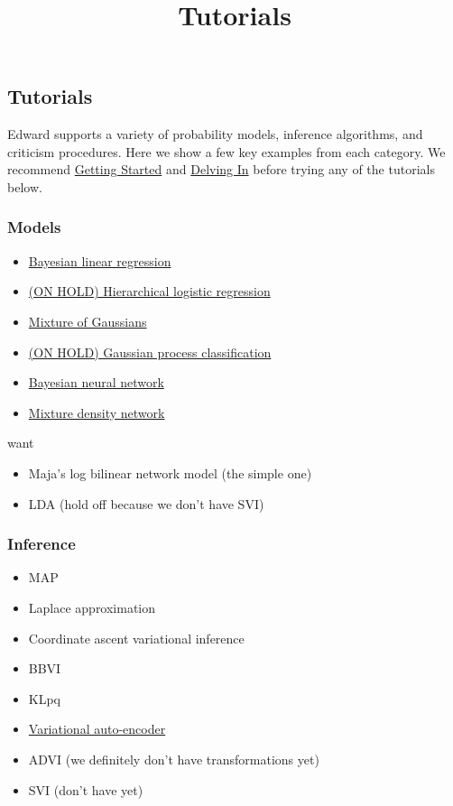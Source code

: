 \title{Tutorials}

\subsection{Tutorials}

Edward supports a variety of probability models, inference
algorithms, and criticism procedures. Here we show a few key examples from each
category. We recommend \href{getting-started.html}{Getting Started} and 
\href{delving-in.html}{Delving In} before trying any of the tutorials below.

\subsubsection{Models}

\begin{itemize}
\item \href{tut_bayesian_linear_regression.html}{Bayesian linear regression}
\item
  \href{tut_hierarchical_logistic_regression.html}{(ON HOLD) Hierarchical
  logistic regression}
\item
  \href{tut_mixture_gaussian.html}{Mixture of Gaussians}
\item
  \href{tut_gp_classification.html}{(ON HOLD) Gaussian process classification}
\item
  \href{https://github.com/blei-lab/edward/blob/master/examples/bayesian_nn.py}{Bayesian
  neural network}
\item
  \href{https://github.com/blei-lab/edward/blob/master/examples/mixture_density_network.py}{Mixture
  density network}
\end{itemize}

want

\begin{itemize}
  \item Maja's log bilinear network model (the simple one)
  \item LDA (hold off because we don't have SVI)
\end{itemize}

\subsubsection{Inference}

\begin{itemize}
  \item MAP
  \item Laplace approximation
  \item Coordinate ascent variational inference
  \item BBVI
  \item KLpq
  \item
  \href{https://github.com/blei-lab/edward/blob/master/examples/convolutional_vae.py}{Variational
  auto-encoder}
  \item ADVI (we definitely don't have transformations yet)
  \item SVI (don't have yet)
\end{itemize}

